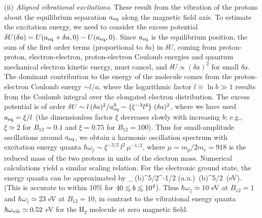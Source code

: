 (ii) {\it Aligned vibrational excitations}.
These result from the vibration of the protons about the
equilibrium separation $a_{\rm eq}$ along the magnetic field axis.
To estimate the excitation energy, we need to consider the
excess potential $\delta U(\delta a)=U(a_{\rm eq}+\delta a,0)-U(a_{\rm eq},0)$.
Since $a_{\rm eq}$ is the equilibrium position, the sum of the 
first order terms (proportional to $\delta a$) in $\delta U$,
coming from proton-proton, electron-electron,
proton-electron Coulomb energies and quantum mechanical electron
kinetic energy, must cancel, and $\delta U\propto (\delta a)^2$ for small
$\delta a$. The dominant contribution to the energy of the molecule
comes from the proton-electron Coulomb energy
$\sim l/a$, where the logarithmic factor $l\equiv\ln b\gg 1$ results from 
the Coulomb integral over the elongated electron distribution. 
The excess potential is of order $\delta U
\sim l\,(\delta a)^2/a_{\rm eq}^3\sim \left(\xi^{-3}l^4\right)\,(\delta a)^2$,
where we have used $a_{\rm eq}=\xi/l$ (the dimensionless factor $\xi$ 
decreases slowly with increasing $b$; e.g., $\xi\simeq 2$ for $B_{12}=0.1$ and
$\xi=0.75$ for $B_{12}=100$). Thus for small-amplitude oscillations 
around $a_{\rm eq}$, we obtain a harmonic oscillation spectrum 
with excitation energy quanta $\hbar \omega_{\parallel} \sim
\xi^{-3/2}\,l^2\,\mu^{-1/2}$, where $\mu=m_p/2m_e=918$ is the reduced 
mass of the two protons in units of the electron 
mass. Numerical calculations yield a similar scaling relation.
For the electronic ground state, the energy quanta can be approximated by
\be
\hbar\omega_\parallel{}\,(\ln b)^{5/2}\mu^{-1/2} ({\rm a.u.})
\,(\ln b)^{5/2}~({\rm eV}).
\ee
(This is accurate to within $10\%$ for $40\lo b\lo 10^4$).
Thus $\hbar\omega_{\parallel}\simeq 10$ eV at $B_{12}=1$ 
and $\hbar\omega_{\parallel}\simeq 23$ eV at $B_{12}=10$, in contrast to 
the vibrational energy quanta $\hbar\omega_{\rm vib}\simeq 0.52$ eV for 
the H$_2$ molecule at zero magnetic field. 

